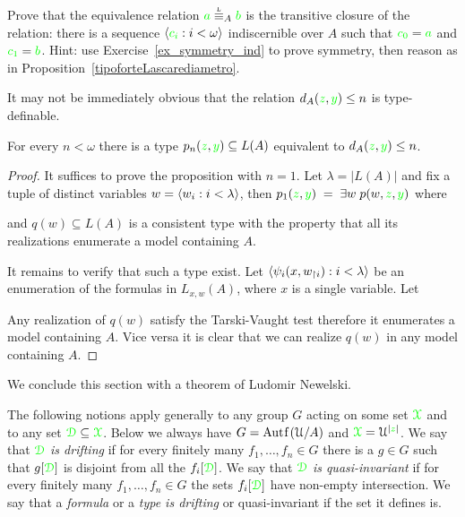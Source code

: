 \documentclass[creche.tex]{subfiles}
\begin{document}
\begin{exercise}\label{ex_Lstp_indiscernibles}
  Prove that the equivalence relation ${\gr a}\stackrel{\smash{\scalebox{.5}{\rm L}}}{\equiv}_A{\gr b}$ is the transitive closure of the relation: there is a sequence $\langle{\color{green}c_i}:i<\omega\rangle$ indiscernible over $A$ such that ${\color{green} c_0}={\color{green} a}$ and ${\color{green} c_1}={\color{green} b}$. Hint: use Exercise~\ref{ex_symmetry_ind} to prove symmetry, then reason as in Proposition~\ref{tipoforteLascarediametro}.\QED
\end{exercise}

It may not be immediately obvious that the relation $d_A({\color{green} z},{\color{green} y})\le n$ is type-definable. 

\begin{proposition}\label{prop_Lascar_distance_type_def}
For every $n<\omega$ there is a type $p_n({\color{green} z},{\color{green} y})\subseteq L(A)$ equivalent to $d_A({\color{green} z},{\color{green} y})\le n$.  
\end{proposition}
\begin{proof}
It suffices to prove the proposition with $n=1$. Let $\lambda=|L(A)|$ and fix a tuple of distinct variables $w=\langle w_i:i<\lambda\rangle$, then $p_1({\color{green} z},{\color{green} y})\;=\;\exists w\;p(w,{\color{green} z},{\color{green} y})$ where


and $q(w)\subseteq L(A)$ is a consistent type with the property that all its realizations enumerate a model containing $A$.

It remains to verify that such a type exist. Let $\langle\psi_i(x,w_{\restriction i}):i<\lambda\rangle$ be an enumeration of the formulas in $L_{x,w}(A)$, where $x$ is a single variable. Let 


Any realization of $q(w)$ satisfy the Tarski-Vaught test therefore it enumerates a model containing $A$. Vice versa it is clear that we can realize $q(w)$ in any model containing $A$.
\end{proof}

We conclude this section with a theorem of Ludomir Newelski. 

The following notions apply generally to any group $G$ acting on some set ${\color{green}\EuScript X}$ and to any set ${\color{green}\EuScript D}\subseteq {\color{green}\EuScript X}$. Below we always have $G=\mathord{\rm Aut\kern.15ex{f}\kern.15ex}(\EuScript U/A)$ and ${\color{green}\EuScript X}=\EuScript U^{|{\color{green} z}|}$.  We say that ${\color{green}\EuScript D}$ \emph{is drifting\/} if for every finitely many $f_1,\dots,f_n\in G$ there is a $g\in G$ such that $g[{\color{green}\EuScript D}]$ is disjoint from all the $f_i[{\color{green}\EuScript D}]$. We say that ${\color{green}\EuScript D}$ \emph{is quasi-invariant\/} if for every finitely many $f_1,\dots,f_n\in G$ the sets  $f_i[{\color{green}\EuScript D}]$ have non-empty intersection. We say that a \emph{formula\/} or a \emph{type is drifting\/} or quasi-invariant if the set it defines is.
\end{document}
